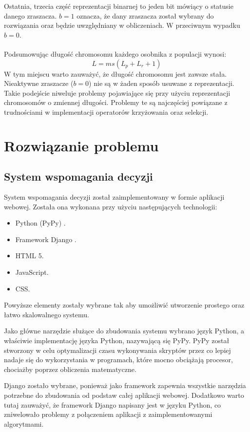 \documentclass[twoside]{iisthesis}
\begin{document}
Ostatnia, trzecia część reprezentacji binarnej to jeden bit mówiący o statusie danego zraszacza. $b = 1$ oznacza, że dany zraszacza został wybrany do rozwiązania oraz będzie uwzględniany w obliczeniach. W przeciwnym wypadku $b = 0$.\\\\
Podsumowując długość chromosomu każdego osobnika z populacji wynosi:
\begin{equation}
	L = ms(L_{p} + L_{r} + 1)
\end{equation}
W tym miejscu warto zauważyć, że długość chromosomu jest zawsze stała. Nieaktywne zraszacze ($b=0$) nie są w żaden sposób usuwane z reprezentacji. Takie podejście niweluje problemy pojawiające się przy użyciu reprezentacji chromosomów o zmiennej długości. Problemy te są najczęściej powiązane z trudnościami w implementacji operatorów krzyżowania oraz selekcji.
\chapter{Rozwiązanie problemu}
\section{System wspomagania decyzji}
System wspomagania decyzji został zaimplementowany w formie aplikacji webowej. Została ona wykonana przy użyciu następujących technologii:\\
\begin{itemize}
	\item Python (PyPy) \cite{pypy}.
	\item Framework Django \cite{django}.
	\item HTML 5.
	\item JavaScript.
	\item CSS.\\
\end{itemize}

Powyższe elementy zostały wybrane tak aby umożliwić utworzenie prostego oraz łatwo skalowalnego systemu.

Jako główne narzędzie służące do zbudowania systemu wybrano język Python, a właściwie implementację języka Python, nazywającą się PyPy. PyPy został stworzony w celu optymalizacji czasu wykonywania skryptów przez co lepiej nadaje się do wykorzystania w programach, które mocno obciążają procesor, chociażby poprzez obliczenia matematyczne.

Django zostało wybrane, ponieważ jako framework zapewnia wszystkie narzędzia potrzebne do zbudowania od podstaw całej aplikacji webowej. Dodatkowo warto tutaj zauważyć, że framework Django napisany jest w języku Python, co zniwelowało problemy z połączeniem aplikacji z zaimplementowanymi algorytmami.
\end{document}
